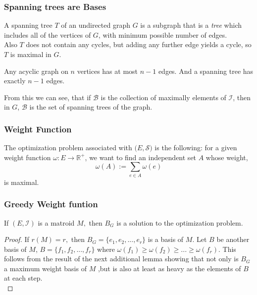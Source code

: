 \documentclass{beamer}
\begin{document}
\begin{frame}
\frametitle{Spanning trees are Bases}
\begin{definition}
A spanning tree $T$ of an undirected graph $G$ is a subgraph that is a \textit{tree} which includes all of the vertices of $G$, with minimum possible number of edges.\\
Also $T$ does not contain any cycles, but adding any further edge yields a cycle, so $T$ is maximal in $G$.\\
\end{definition}
\begin{lemma}
Any acyclic graph on $n$ vertices has at most $n-1$ edges. And a spanning tree has exactly $n-1$ edges.
\end{lemma}
From this we can see, that if $\mathcal{B}$ is the collection of maximally elements of $\mathcal{I}$, then in $G$, $\mathcal{B}$ is the set of spanning trees of the graph.
\end{frame}

\begin{frame}
\frametitle{Weight Function}
The optimization problem associated with $(E,\mathcal{S)}$ is the following: for a given weight function $\omega : E \rightarrow \mathbb{R^{+}}$, we want to find an independent set $A$ whose weight,
\begin{equation}
\omega(A) := \sum_{e \in A} \omega (e)
\end{equation}
is maximal.
\end{frame}

\begin{frame}
\frametitle{Greedy Weight funtion}
\begin{lemma}
If $(E,\mathcal{I})$ is a matroid $M,$ then $B_G$ is a solution to the optimization problem.
\end{lemma}
\begin{proof}
If $r(M) = r,$ then $B_G = \{e_1,e_2, ..., e_r\}$ is a basis of $M.$ Let $B$ be another basis of $M$, $B = \{f_1, f_2, ..., f_r\}$
where $\omega(f_1) \geq \omega(f_2) \geq ... \geq \omega(f_r).$ This follows from the result of the next additional lemma showing that not only is $B_G$ a maximum weight basis of $M$ ,but is also at least as heavy as the elements of $B$ at each step.\\
\end{proof}
\end{frame}
\end{document}
